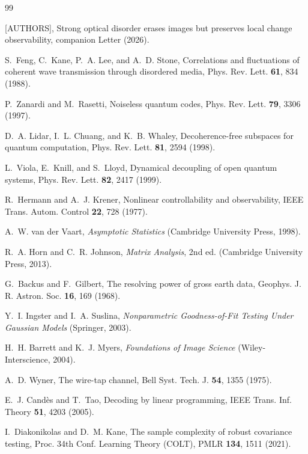\documentclass[10pt,twocolumn]{article}
\theoremstyle{plain}
\theoremstyle{definition}
\begin{document}
\begin{thebibliography}{99}

[AUTHORS], Strong optical disorder erases images but preserves local change
observability, companion Letter (2026).

S.~Feng, C.~Kane, P.~A. Lee, and A.~D. Stone,
Correlations and fluctuations of coherent wave transmission through disordered
media, Phys. Rev. Lett. \textbf{61}, 834 (1988).

P.~Zanardi and M.~Rasetti,
Noiseless quantum codes, Phys. Rev. Lett. \textbf{79}, 3306 (1997).

D.~A. Lidar, I.~L. Chuang, and K.~B. Whaley,
Decoherence-free subspaces for quantum computation,
Phys. Rev. Lett. \textbf{81}, 2594 (1998).

L.~Viola, E.~Knill, and S.~Lloyd,
Dynamical decoupling of open quantum systems,
Phys. Rev. Lett. \textbf{82}, 2417 (1999).

R.~Hermann and A.~J. Krener,
Nonlinear controllability and observability,
IEEE Trans. Autom. Control \textbf{22}, 728 (1977).

A.~W. van der Vaart,
\emph{Asymptotic Statistics} (Cambridge University Press, 1998).

R.~A. Horn and C.~R. Johnson,
\emph{Matrix Analysis}, 2nd ed. (Cambridge University Press, 2013).

G.~Backus and F.~Gilbert,
The resolving power of gross earth data,
Geophys. J. R. Astron. Soc. \textbf{16}, 169 (1968).

Y.~I. Ingster and I.~A. Suslina,
\emph{Nonparametric Goodness-of-Fit Testing Under Gaussian Models}
(Springer, 2003).

H.~H. Barrett and K.~J. Myers,
\emph{Foundations of Image Science} (Wiley-Interscience, 2004).

A.~D. Wyner,
The wire-tap channel, Bell Syst. Tech. J. \textbf{54}, 1355 (1975).

E.~J. Cand\`es and T.~Tao,
Decoding by linear programming, IEEE Trans. Inf. Theory \textbf{51}, 4203 (2005).

I.~Diakonikolas and D.~M. Kane,
The sample complexity of robust covariance testing,
Proc. 34th Conf. Learning Theory (COLT), PMLR \textbf{134}, 1511 (2021).


\end{thebibliography}
\end{document}
